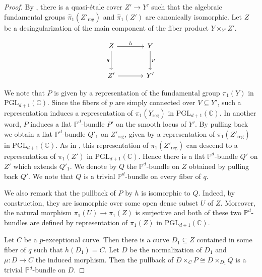 \documentclass[english,reqno]{amsart}
\theoremstyle{plain}
\theoremstyle{definition}
\numberwithin{equation}{section} %
\begin{document}
\begin{proof}
    By \cite[Theorem 1.5]{GrebKebekusPeternell2016b}, there is a quasi-\'etale cover $Z'\to Y'$ such that the algebraic fundamental groups $\hat{\pi}_1(Z'_{\mathrm{reg}})$ and $\hat{\pi}_1(Z')$ are canonically isomorphic. Let $Z$ be a desingularization of the main component of the fiber product $Y\times_{Y'} Z'$.

    \[\begin{tikzcd}[column sep=large, row sep=large]
        Z \rar{h}\dar[swap]{q}   &   Y\dar{p}\\
        Z' \rar   &   Y'
      \end{tikzcd}
    \]


    We note that $P$ is given by a representation of the fundamental group $\pi_1(Y)$ in $\mathrm{PGL}_{d+1}(\mathbb{C})$.
    Since the  fibers of $p$ are simply connected over   $V\subseteq Y'$, such a representation induces a representation of $\pi_1(Y_{\mathrm{reg}})$ in $\mathrm{PGL}_{d+1}(\mathbb{C})$.
    In another word, $P$ induces a flat $\mathbb{P}^d$-bundle $P'$ on the smooth locus of $Y'$.
    By pulling back we obtain a flat $\mathbb{P}^d$-bundle $Q'_1$ on  $Z'_{\mathrm{reg}}$,  given by a representation of $\pi_1(Z'_{\mathrm{reg}})$ in $\mathrm{PGL}_{d+1}(\mathbb{C})$.
    As in \cite[Proof of Theorem 1.14 on page 1990]{GrebKebekusPeternell2016b},   this representation of $\pi_1(Z'_{\mathrm{reg}})$ can descend to a representation  of $\pi_1(Z') $ in $\mathrm{PGL}_{d+1}(\mathbb{C})$.
    Hence there is a flat $\mathbb{P}^d$-bundle $Q'$ on $Z'$ which extends $Q'_1$. We denote by $Q$ the $\mathbb{P}^d$-bundle on $Z$ obtained by pulling back $Q'$. We note that $Q$ is a trivial  $\mathbb{P}^d$-bundle on every fiber of $q$.

    We also remark that the pullback of $P$ by $h$ is  isomorphic to $Q$.  Indeed, by construction, they are isomorphic over some open dense subset $U$ of $Z$. Moreover, the natural morphism $\pi_1(U) \to \pi_1(Z)$ is surjective and  both of these two $\mathbb{P}^d$-bundles are defined by representation of $\pi_1(Z)$ in $\mathrm{PGL}_{d+1}(\mathbb{C})$.

     Let $C$ be a    $p$-exceptional curve. Then there is a   curve $D_1\subseteq Z$ contained in some fiber of $q$ such that  $h(D_1)=C$. Let $D$ be the normalization of $D_1$ and $\mu\colon D\to C$ the induced morphism. Then the pullback of $D\times_C P \cong D\times_{D_1} Q$ is a trivial $\mathbb{P}^d$-bundle  on $D$.
\end{proof}
\end{document}
